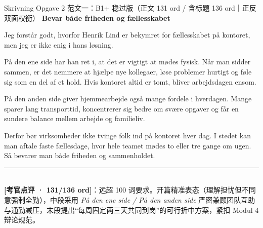 \begin{emailbox}{Skrivning Opgave 2 范文一：B1+ 稳过版（正文 131 ord / 含标题 136 ord｜正反双面权衡）}
\textbf{\color{NCDNavy}Bevar både friheden og fællesskabet}

\vspace{0.25em}
Jeg forstår godt, hvorfor Henrik Lind er bekymret for fællesskabet på kontoret, men jeg er ikke enig i hans løsning.

\vspace{0.25em}
På den ene side har han ret i, at det er vigtigt at mødes fysisk. Når man sidder sammen, er det nemmere at hjælpe nye kollegaer, løse problemer hurtigt og føle sig som en del af et hold. Hvis kontoret altid er tomt, bliver arbejdsdagen ensom.

\vspace{0.25em}
På den anden side giver hjemmearbejde også mange fordele i hverdagen. Mange sparer lang transporttid, koncentrerer sig bedre om svære opgaver og får en sundere balance mellem arbejde og familieliv.

\vspace{0.25em}
Derfor bør virksomheder ikke tvinge folk ind på kontoret hver dag. I stedet kan man aftale faste fællesdage, hvor hele teamet mødes to eller tre gange om ugen. Så bevarer man både friheden og sammenholdet.

\vspace{0.3em}
\rule{\linewidth}{0.4pt}\\[0.2em]
\small\textbf{\color{NCDTeal}[考官点评 · 131/136 ord]}：远超 100 词要求。开篇精准表态（理解担忧但不同意强制全勤），中段采用 \textit{På den ene side / På den anden side} 严密兼顾团队互助与通勤减压，末段提出“每周固定两三天共同到岗”的可行折中方案，紧扣 Modul 4 辩论规范。
\end{emailbox}

